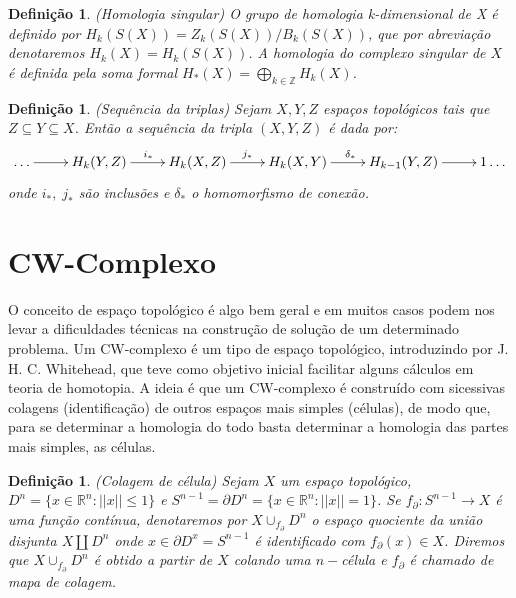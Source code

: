 \documentclass[12pt]{book}
\newtheorem{definicao}[teorema]{Definição}
\newcommand{\homologiarel}[3]{H_{#1}(#2,#3)}
\newcommand{\inteiros}{\mathbb{Z}}
\begin{document}
	\begin{definicao}
		(Homologia singular) O grupo de homologia k-dimensional de X é definido por $H_{k}(S(X)) = Z_{k}(S(X))/B_{k}(S(X))$, que por abreviação denotaremos $H_{k}(X)=H_{k}(S(X))$. A homologia do complexo singular de $X$ é definida pela soma formal $H_{*}(X) = \bigoplus_{k \in \inteiros}H_{k}(X)$.
	\end{definicao}
	
	\begin{definicao}
		(Sequência da triplas) Sejam $X, Y, Z$ espaços topológicos tais que $Z \subseteq Y \subseteq X$. Então a sequência da tripla $(X,Y,Z)$ é dada por:
		$$
		\xymatrix{
			\dots \ar[r] & \homologiarel{k}{Y}{Z} \ar[r]^{i_{*}} & \homologiarel{k}{X}{Z} \ar[r]^{j_{*}} & \homologiarel{k}{X}{Y} \ar[r]^{\delta_{*}} & \homologiarel{k-1}{Y}{Z} \ar[r] & 1\dots
		}
		$$
		onde $i_{*},\;j_{*}$ são inclusões e $\delta_{*}$ o homomorfismo de conexão.
	\end{definicao}
	
	\section{CW-Complexo}\label{secao_cw_complexo}
	O conceito de espaço topológico é algo bem geral e em muitos casos podem nos levar a dificuldades técnicas na construção de solução de um determinado problema. Um CW-complexo é um tipo de espaço topológico, introduzindo por J. H. C. Whitehead, que teve como objetivo inicial facilitar alguns cálculos em teoria de homotopia. A ideia é que um CW-complexo é construído com sicessivas colagens (identificação) de outros espaços mais simples (células), de modo que, para se determinar a homologia do todo basta determinar a homologia das partes mais simples, as células.
	\begin{definicao}
		(Colagem de célula) Sejam $X$ um espaço topológico, $D^{n}=\{x\in \mathbb{R}^{n} : ||x|| \leq 1\}$ e $S^{n-1} = \partial D^{n}=\{x\in \mathbb{R}^{n} : ||x|| = 1\}$. Se $f_{\partial}:S^{n-1} \to X$ é uma função contínua, denotaremos por $X\cup_{f_{\partial}}D^{n}$ o espaço quociente da união disjunta $X \coprod D^{n}$ onde $x \in \partial D^{x} = S^{n-1}$ é identificado com $f_{\partial}(x) \in X$. Diremos que $X\cup_{f_{\partial}}D^{n}$ é obtido a partir de $X$ colando uma $n-$célula e $f_{\partial}$ é chamado de mapa de colagem.
	\end{definicao}
	
\end{document}
